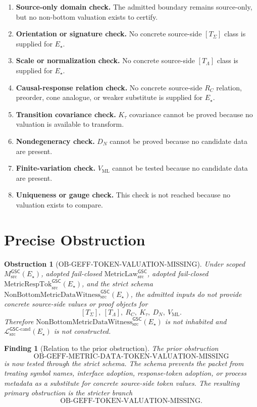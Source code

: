 \documentclass[11pt]{article}
\newtheorem{obstruction}{Obstruction}
\newtheorem{finding}{Finding}
\newcommand{\MsrcGSC}{M_{\mathrm{src}}^{\mathsf{GSC}}}
\newcommand{\MetricLaw}{\mathrm{MetricLaw}_{\mathrm{src}}^{\mathsf{GSC}}}
\newcommand{\MetricRespTok}{\mathrm{MetricRespTok}_{\mathrm{src}}^{\mathsf{GSC}}}
\newcommand{\Witness}{\mathrm{NonBottomMetricDataWitness}_{\mathrm{src}}^{\mathsf{GSC}}}
\newcommand{\MetricDataCand}{\mathcal{L}_{\mathrm{src}}^{\mathsf{GSC}\mbox{-}\mathrm{cand}}}
\begin{document}
\begin{enumerate}[label=\textbf{C\arabic*.},leftmargin=*]
  \item \textbf{Source-only domain check.} The admitted boundary remains
  source-only, but no non-bottom valuation exists to certify.
  \item \textbf{Orientation or signature check.} No concrete source-side
  \([T_{\Sigma}]\) class is supplied for \(E_{\star}\).
  \item \textbf{Scale or normalization check.} No concrete source-side
  \([T_{\Lambda}]\) class is supplied for \(E_{\star}\).
  \item \textbf{Causal-response relation check.} No concrete source-side
  \(R_C\) relation, preorder, cone analogue, or weaker substitute is supplied
  for \(E_{\star}\).
  \item \textbf{Transition covariance check.} \(K_{\tau}\) covariance cannot
  be proved because no valuation is available to transform.
  \item \textbf{Nondegeneracy check.} \(D_N\) cannot be proved because no
  candidate data are present.
  \item \textbf{Finite-variation check.} \(V_{\mathrm{ML}}\) cannot be tested
  because no candidate data are present.
  \item \textbf{Uniqueness or gauge check.} This check is not reached because
  no valuation exists to compare.
\end{enumerate}

\section{Precise Obstruction}

\begin{obstruction}[OB-GEFF-TOKEN-VALUATION-MISSING]
Under scoped \(\MsrcGSC(E_{\star})\), adopted fail-closed \(\MetricLaw\),
adopted fail-closed \(\MetricRespTok(E_{\star})\), and the strict schema
\(\Witness(E_{\star})\), the admitted inputs do not provide concrete
source-side values or proof objects for
\[
  [T_{\Sigma}],\ [T_{\Lambda}],\ R_C,\ K_{\tau},\ D_N,\ V_{\mathrm{ML}}.
\]
Therefore \(\Witness(E_{\star})\) is not inhabited and
\(\MetricDataCand(E_{\star})\) is not constructed.
\end{obstruction}

\begin{finding}[Relation to the prior obstruction]
The prior obstruction
\[
  \mathrm{OB\mbox{-}GEFF\mbox{-}METRIC\mbox{-}DATA\mbox{-}TOKEN\mbox{-}VALUATION\mbox{-}MISSING}
\]
is now tested through the strict schema. The schema prevents the packet from
treating symbol names, interface adoption, response-token adoption, or process
metadata as a substitute for concrete source-side token values. The resulting
primary obstruction is the stricter branch
\[
  \mathrm{OB\mbox{-}GEFF\mbox{-}TOKEN\mbox{-}VALUATION\mbox{-}MISSING}.
\]
\end{finding}
\end{document}
